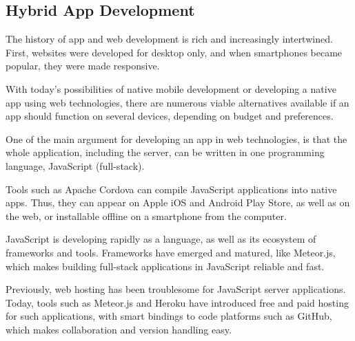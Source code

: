\subsection{Hybrid App Development}

The history of app and web development is rich and increasingly intertwined. First, websites were developed for desktop only, and when smartphones became popular, they were made responsive.

With today's possibilities of native mobile development or developing a native app using web technologies, there are numerous viable alternatives available if an app should function on several devices, depending on budget and preferences.

One of the main argument for developing an app in web technologies, is that the whole application, including the server, can be written in one programming language, JavaScript (full-stack).

Tools such as Apache Cordova can compile JavaScript applications into native apps. Thus, they can appear on Apple iOS and Android Play Store, as well as on the web, or installable offline on a smartphone from the computer.

JavaScript is developing rapidly as a language, as well as its ecosystem of frameworks and tools. Frameworks have emerged and matured, like Meteor.js, which makes building full-stack applications in JavaScript reliable and fast.

Previously, web hosting has been troublesome for JavaScript server applications. Today, tools such as Meteor.js and Heroku have introduced free and paid hosting for such applications, with smart bindings to code platforms such as GitHub, which makes collaboration and version handling easy.

